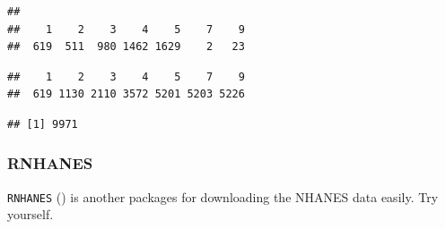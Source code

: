 \documentclass[
]{book}
\newenvironment{Shaded}{\begin{snugshade}}{\end{snugshade}}
\newcommand{\KeywordTok}[1]{\textcolor[rgb]{0.13,0.29,0.53}{\textbf{#1}}}
\newcommand{\NormalTok}[1]{#1}
\newcommand{\OperatorTok}[1]{\textcolor[rgb]{0.81,0.36,0.00}{\textbf{#1}}}
\begin{document}
\begin{Shaded}
\end{Shaded}

\begin{verbatim}
## 
##    1    2    3    4    5    7    9 
##  619  511  980 1462 1629    2   23
\end{verbatim}

\begin{Shaded}
\end{Shaded}

\begin{verbatim}
##    1    2    3    4    5    7    9 
##  619 1130 2110 3572 5201 5203 5226
\end{verbatim}

\begin{Shaded}
\end{Shaded}

\begin{verbatim}
## [1] 9971
\end{verbatim}

\hypertarget{rnhanes}{%
\subsubsection{RNHANES}\label{rnhanes}}

\texttt{RNHANES} (\citet{RNHANES}) is another packages for downloading the NHANES data easily. Try yourself.

  
\end{document}
